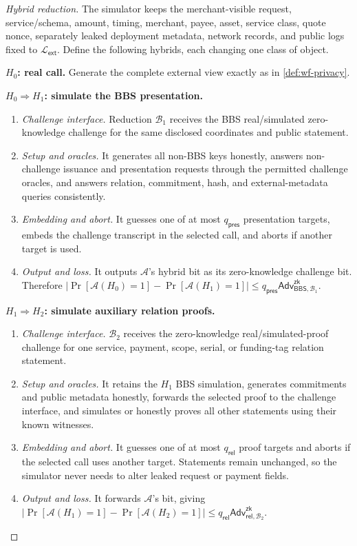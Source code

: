 \documentclass[letterpaper]{article}
\newcommand{\adv}{\mathcal{A}}
\newcommand{\bbs}{\mathsf{BBS}}
\newcommand{\Adv}{\mathsf{Adv}}
\begin{document}
\begin{proof}[Hybrid reduction]
The simulator keeps the merchant-visible request, service/schema, amount,
timing, merchant, payee, asset, service class, quote nonce, separately
leaked deployment metadata, network records, and public logs fixed to
\(\mathcal L_{\mathsf{ext}}\). Define the following hybrids, each changing one
class of object.

\textbf{\(H_0\): real call.}
Generate the complete external view exactly as in
\cref{def:wf-privacy}.

\textbf{\(H_0\Rightarrow H_1\): simulate the BBS presentation.}
\begin{enumerate}
  \item \emph{Challenge interface.} Reduction \(\mathcal B_1\) receives the
  BBS real/simulated zero-knowledge challenge for the same disclosed
  coordinates and public statement.
  \item \emph{Setup and oracles.} It generates all non-BBS keys honestly,
  answers non-challenge issuance and presentation requests through the
  permitted challenge oracles, and answers relation, commitment, hash, and
  external-metadata queries consistently.
  \item \emph{Embedding and abort.} It guesses one of at most
  \(q_{\mathsf{pres}}\) presentation targets, embeds the challenge transcript in
  the selected call, and aborts if another target is used.
  \item \emph{Output and loss.} It outputs \(\adv\)'s hybrid bit as its
  zero-knowledge challenge bit. Therefore
  \(\lvert\Pr[\adv(H_0)=1]-\Pr[\adv(H_1)=1]\rvert
  \le q_{\mathsf{pres}}\Adv^{\mathsf{zk}}_{\bbs,\mathcal B_1}\).
\end{enumerate}

\textbf{\(H_1\Rightarrow H_2\): simulate auxiliary relation proofs.}
\begin{enumerate}
  \item \emph{Challenge interface.} \(\mathcal B_2\) receives the zero-knowledge
  real/simulated-proof challenge for one service, payment, scope, serial, or
  funding-tag relation statement.
  \item \emph{Setup and oracles.} It retains the \(H_1\) BBS simulation,
  generates commitments and public metadata honestly, forwards the selected
  proof to the challenge interface, and simulates or honestly proves all other
  statements using their known witnesses.
  \item \emph{Embedding and abort.} It guesses one of at most
  \(q_{\mathsf{rel}}\) proof targets and aborts if the selected call uses
  another target. Statements remain unchanged, so the simulator never needs
  to alter leaked request or payment fields.
  \item \emph{Output and loss.} It forwards \(\adv\)'s bit, giving
  \(\lvert\Pr[\adv(H_1)=1]-\Pr[\adv(H_2)=1]\rvert
  \le q_{\mathsf{rel}}\Adv^{\mathsf{zk}}_{\mathsf{rel},\mathcal B_2}\).
\end{enumerate}


\end{proof}
\end{document}
